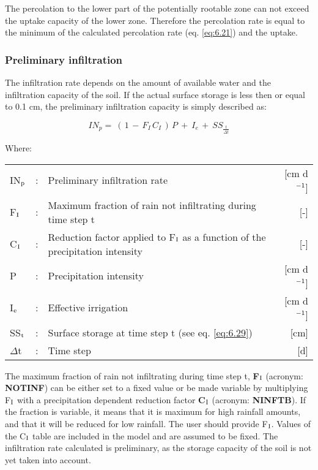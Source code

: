 The percolation to the lower part of the potentially rootable zone can not exceed the
uptake capacity of the lower zone. Therefore the percolation rate is equal to the minimum
of the calculated percolation rate (eq. \ref{eq:6.21}) and the uptake.

\subsubsection{Preliminary infiltration}
The infiltration rate depends on the amount of available water and the infiltration capacity
of the soil. If the actual surface storage is less then or equal to 0.1 cm, the preliminary
infiltration capacity is simply described as:

\begin{equation}
\label{eq:6.26}
IN_{p} =~ (\, 1\, -\, F _{I} \, C _{I} \, )\, P~+~ I _{e~} +~ SS _{\frac{t}{ \Delta t}} 
\end{equation}

Where:\\[5pt]
\begin{tabularx}{\textwidth}{llXr}
	IN$_{{\rm p}}$ &:& Preliminary infiltration rate  & [cm d$^{{\rm -1}}$]\\
	F$_{{\rm I}}$ &:& Maximum fraction of rain not infiltrating during time step t  & [-]\\
	C$_{{\rm I}}$ &:& Reduction factor applied to F$_{{\rm I}}$ as a function of the 
	precipitation intensity  & [-]\\
	P &:& Precipitation intensity  & [cm d$^{{\rm -1}}$]\\
	I$_{{\rm e}}$ &:& Effective irrigation  & [cm d$^{{\rm -1}}$]\\
	SS$_{{\rm t}}$ &:& Surface storage at time step t (see eq. \ref{eq:6.29})  & [cm]\\
	$\Delta$t &:& Time step  & [d]\\
\end{tabularx}

The maximum fraction of rain not infiltrating during time step t, {\bf F$_{{\rm I}}$} 
(acronym: {\bf NOTINF})
can be either set to a fixed value or be made variable by multiplying F$_{{\rm I}}$ 
with a precipitation dependent reduction factor {\bf C$_{{\rm I}}$} (acronym: {\bf NINFTB}). 
If the fraction is variable, it means that it is maximum for high rainfall amounts, and 
that it will be reduced for low rainfall. The user should provide F$_{{\rm I}}$. 
Values of the C$_{{\rm I}}$ table are included in the model and
are assumed to be fixed. The infiltration rate calculated is preliminary, as the storage
capacity of the soil is not yet taken into account. 

